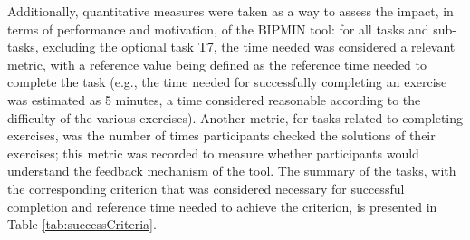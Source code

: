 Additionally, quantitative measures were taken as a way to assess the impact, in terms of performance and motivation, of the BIPMIN tool: for all tasks and sub-tasks, excluding the optional task T7, the time needed was considered a relevant metric, with a reference value being defined as the reference time needed to complete the task (e.g., the time needed for successfully completing an exercise was estimated as 5 minutes, a time considered reasonable according to the difficulty of the various exercises). Another metric, for tasks related to completing exercises, was the number of times participants checked the solutions of their exercises; this metric was recorded to measure whether participants would understand the feedback mechanism of the tool. The summary of the tasks, with the corresponding criterion that was considered necessary for successful completion and reference time needed to achieve the criterion, is presented in Table \ref{tab:successCriteria}.

